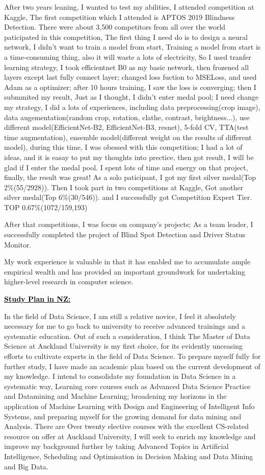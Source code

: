 \documentclass{article}
\newcommand{\statement}[1]{\par\medskip
  \underline{\textcolor{black}{\textbf{#1:}}}\space
}
\begin{document}
After two years leaning, I wanted to test my abilities, I attended competition at Kaggle, The first competition which I attended is APTOS 2019 Blindness Detection. There were about 3,500 competitors from all over the world paticipated in this competition, The first thing I need do is to design a neural network, I didn't want to train a model from start, Training a model from start is a time-consuming thing, also it will waste a lots of electricity, So I used tranfer learning strategy, I took efficientnet B0 as my basic network, then frozened all layers except last fully connect layer; changed loss fuction to MSELoss, and used Adam as a optimizer; after 10 hours training, I saw the loss is converging; then I submmited my result, Just as I thought, I didn't enter medal pool; I need change my strategy, I did a lots of experiences, including data preprocessing(crop image), data augementation(random crop, rotation, clathe, contrast, brightness...), use different model(EfficientNet-B2, EfficientNet-B3, resnet),  5-fold CV, TTA(test time augmentation), ensemble model(different weight on the results of different model), during this time, I was obessed with this competition; I had a lot of ideas, and it is easay to put my thoughts into prectice, then got result, I will be glad if I enter the medal pool. I spent lots of time and energy on that project, finally, the result was great! As a solo paticipant, I got my first silver medal(Top 2\%(55/2928)). Then I took part in two  competitions at Kaggle, Got another silver medal(Top 6\%(30/546)). and I successfully got Competition Expert Tier. TOP 0.67\%(1072/159,193)

After that competitions, I was focus on company's projects; As a team leader, I successfully completed the project of Blind Spot Detection and Driver Status Monitor.

My work experience is valuable in that it has enabled me to accumulate ample empirical wealth and has provided an important groundwork for undertaking higher-level research in computer science.

\statement{Study Plan in NZ}

In the field of Data Science, I am still a relative novice, I feel it absolutely necessary for me to go back to university to receive advanced trainings and a systematic education. Out of such a consideration, I think The Master of Data Science at Auckland University is my first choice, for its evidently unceasing efforts to cultivate experts in the field of Data Science. To prepare myself fully for further study, I have made an academic plan based on the current development of my knowledge. I intend to consolidate my foundation in Data Science in a systematic way, Learning core courses such as Advanced Data Science Practice and Datamining and Machine Learning; broadening my horizons in the application of Machine Learning with Design and Engineering of Intelligent Info Systems,  and preparing myself for the growing demand for data mining and Analysis. There are Over twenty elective courses with the excellent CS-related resource on offer at Auckland University, I will seek to enrich my knowledge and improve my background further by taking Advanced Topics in Artificial Intelligence, Scheduling and Optimisation in Decision Making and Data Mining and Big Data.
\end{document}
